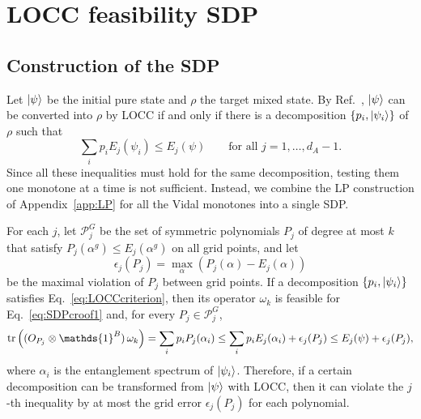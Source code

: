 \documentclass[11pt,a4paper]{report}
\newcommand{\one}{\mathds{1}}
\newcommand{\I}{\one}
\renewcommand{\a}{\alpha}
\begin{document}
\chapter{LOCC feasibility SDP}\label{app:LOCCchap}

\section{Construction of the SDP}\label{app:LOCC}
Let $\ket{\psi}$ be the initial pure state and $\rho$ the target mixed state. By Ref.~\cite{Jonathan_1999}, $\ket{\psi}$ can be converted into $\rho$ by LOCC if and only if there is a decomposition $\{p_i,\ket{\psi_i}\}$ of $\rho$ such that
\begin{equation}\label{eq:LOCCcriterion}
    \sum_i p_i E_j(\psi_i)\leq E_j(\psi)\qquad\text{for all } j=1,\dots,d_A-1 .
\end{equation}
Since all these inequalities must hold for the same decomposition, testing them one monotone at a time is not sufficient. Instead, we combine the LP construction of Appendix~\ref{app:LP} for all the Vidal monotones into a single SDP.

For each $j$, let $\mathcal{P}^G_j$ be the set of symmetric polynomials $P_j$ of degree at most $k$ that satisfy $P_j(\a^g)\leq E_j(\a^g)$ on all grid points, and let
\begin{equation}
    \epsilon_j(P_j)=\max_{\a}\left(P_j(\a)-E_j(\a)\right)
\end{equation}
be the maximal violation of $P_j$ between grid points. If a decomposition $\{p_i,\ket{\psi_i}\}$ satisfies Eq.~\eqref{eq:LOCCcriterion}, then its operator $\omega_{k}$ is feasible for Eq.~\eqref{eq:SDPcroof1} and, for every $P_j\in\mathcal{P}^G_j$,
\begin{equation}\label{eq:LOCCnecessary}
\tr\left((O_{P_j}\otimes\I^B)\,\omega_{k}\right)=\sum_ip_iP_j(\a_i)\leq\sum_ip_iE_j(\a_i)+\epsilon_j(P_j)\leq E_j(\psi)+\epsilon_j(P_j),
\end{equation}
where $\a_i$ is the entanglement spectrum of $\ket{\psi_i}$. Therefore, if a certain decomposition can be transformed from $\ket{\psi}$ with LOCC, then it can violate the $j$-th inequality by at most the grid error $\epsilon_j(P_j)$ for each polynomial.
\end{document}
